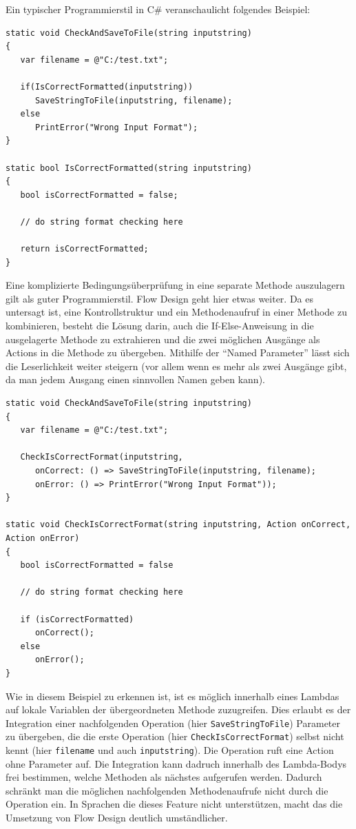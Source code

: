 Ein typischer Programmierstil in C\# veranschaulicht folgendes Beispiel:
\begin{lstlisting}[caption= {Typerischer Programmierstil, der nicht IOSP-konform ist}]
static void CheckAndSaveToFile(string inputstring)
{
   var filename = @"C:/test.txt";

   if(IsCorrectFormatted(inputstring))
      SaveStringToFile(inputstring, filename);
   else
      PrintError("Wrong Input Format");
}

static bool IsCorrectFormatted(string inputstring)
{
   bool isCorrectFormatted = false;

   // do string format checking here

   return isCorrectFormatted;
}
\end{lstlisting}

Eine komplizierte Bedingungsüberprüfung in eine separate Methode auszulagern
gilt als guter Programmierstil. Flow Design geht hier etwas weiter. Da es
untersagt ist, eine Kontrollstruktur und ein Methodenaufruf in einer
Methode zu kombinieren, besteht die Lösung darin, auch die If-Else-Anweisung in
die ausgelagerte Methode zu extrahieren und die zwei möglichen Ausgänge als Actions
in die Methode zu übergeben. Mithilfe der \enquote{Named Parameter} lässt sich die
Leserlichkeit weiter steigern (vor allem wenn es mehr als zwei Ausgänge
gibt, da man jedem Ausgang einen sinnvollen Namen geben kann).

\begin{lstlisting}[caption= {IOSP-konforme Variante}]
static void CheckAndSaveToFile(string inputstring)
{
   var filename = @"C:/test.txt";

   CheckIsCorrectFormat(inputstring, 
      onCorrect: () => SaveStringToFile(inputstring, filename);
      onError: () => PrintError("Wrong Input Format"));
}

static void CheckIsCorrectFormat(string inputstring, Action onCorrect, Action onError)
{
   bool isCorrectFormatted = false

   // do string format checking here

   if (isCorrectFormatted) 
      onCorrect();
   else
      onError();
}
\end{lstlisting}

Wie in diesem Beispiel zu erkennen ist, ist es möglich innerhalb eines
Lambdas auf lokale Variablen der übergeordneten Methode zuzugreifen. Dies
erlaubt es der Integration einer nachfolgenden Operation (hier \texttt{SaveStringToFile}) Parameter zu übergeben,
die die erste Operation (hier \texttt{CheckIsCorrectFormat}) selbst nicht kennt (hier
\texttt{filename} und auch \texttt{inputstring}). Die Operation ruft eine Action ohne
Parameter auf. Die Integration kann dadruch innerhalb des Lambda-Bodys frei
bestimmen, welche Methoden als nächstes aufgerufen werden.
Dadurch schränkt man die möglichen nachfolgenden Methodenaufrufe nicht durch
die Operation ein. In Sprachen die dieses Feature
nicht unterstützen, macht das die Umsetzung von Flow Design deutlich umständlicher.

